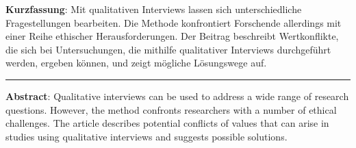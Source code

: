 \textbf{Kurzfassung}: Mit qualitativen Interviews lassen sich
unterschiedliche Fragestellungen bearbeiten. Die Methode konfrontiert
Forschende allerdings mit einer Reihe ethischer Herausforderungen. Der
Beitrag beschreibt Wertkonflikte, die sich bei Untersuchungen, die
mithilfe qualitativer Interviews durchgeführt werden, ergeben können,
und zeigt mögliche Lösungswege auf.

\begin{center}\rule{0.5\linewidth}{0.5pt}\end{center}

\noindent\textbf{Abstract}: Qualitative interviews can be used to address a wide
range of research questions. However, the method confronts researchers
with a number of ethical challenges. The article describes potential
conflicts of values that can arise in studies using qualitative
interviews and suggests possible solutions.
